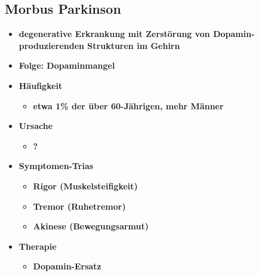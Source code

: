 	\subsection{Morbus Parkinson}
		\begin{itemize}
			\item \textbf{degenerative Erkrankung mit Zerstörung von Dopamin-produzierenden Strukturen im Gehirn}
			\item \textbf{Folge: Dopaminmangel}
			\item \textbf{Häufigkeit}
				\begin{itemize}
					\item \textbf{etwa 1\% der über 60-Jährigen, mehr Männer}
				\end{itemize}
			\item \textbf{Ursache}
				\begin{itemize}
					\item \textbf{?}
				\end{itemize}
			\item \textbf{Symptomen-Trias}
				\begin{itemize}
					\item \textbf{Rigor (Muskelsteifigkeit)}
					\item \textbf{Tremor (Ruhetremor)}
					\item \textbf{Akinese (Bewegungsarmut)}
				\end{itemize}
			\item \textbf{Therapie}
				\begin{itemize}
					\item \textbf{Dopamin-Ersatz}
				\end{itemize}
		\end{itemize}
